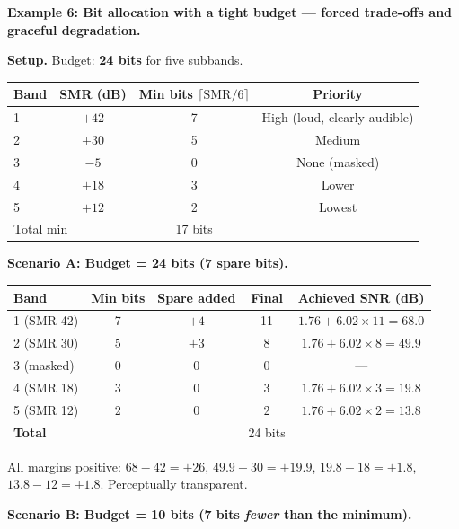 \begin{examplebox}
\textbf{Example 6: Bit allocation with a tight budget --- forced trade-offs and graceful degradation.}

\medskip
\noindent\textbf{Setup.} Budget: \textbf{24 bits} for five subbands.

\begin{center}
\setlength{\tabcolsep}{5pt}
\begin{tabular}{lccc}
\toprule
Band & SMR (dB) & Min bits $\lceil\text{SMR}/6\rceil$ & Priority \\
\midrule
1 & $+42$ & 7 & High (loud, clearly audible) \\
2 & $+30$ & 5 & Medium \\
3 & $-5$  & 0 & None (masked) \\
4 & $+18$ & 3 & Lower \\
5 & $+12$ & 2 & Lowest \\
\midrule
\multicolumn{2}{l}{Total min} & 17 bits & \\
\bottomrule
\end{tabular}
\end{center}

\medskip
\noindent\textbf{Scenario A: Budget = 24 bits (7 spare bits).}

\begin{center}
\begin{tabular}{lcccc}
\toprule
Band & Min bits & Spare added & Final & Achieved SNR (dB) \\
\midrule
1 (SMR 42) & 7 & $+4$ & 11 & $1.76 + 6.02\times11 = 68.0$ \\
2 (SMR 30) & 5 & $+3$ & 8  & $1.76 + 6.02\times8 = 49.9$ \\
3 (masked) & 0 & 0    & 0  & --- \\
4 (SMR 18) & 3 & 0    & 3  & $1.76 + 6.02\times3 = 19.8$ \\
5 (SMR 12) & 2 & 0    & 2  & $1.76 + 6.02\times2 = 13.8$ \\
\midrule
\multicolumn{3}{l}{\textbf{Total}} & 24 bits & \\
\bottomrule
\end{tabular}
\end{center}

All margins positive: $68 - 42 = +26$, $49.9 - 30 = +19.9$, $19.8 - 18 = +1.8$, $13.8 - 12 = +1.8$. Perceptually transparent.

\medskip
\noindent\textbf{Scenario B: Budget = 10 bits (7 bits \emph{fewer} than the minimum).}


\end{examplebox}
